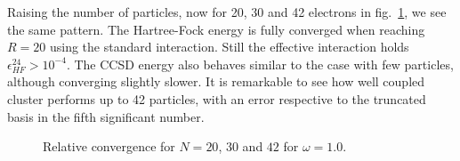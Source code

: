 Raising the number of particles, now for 20, 30 and 42 electrons in fig.~\ref{fig:results:convN20OM1}, we see the same pattern.
The Hartree-Fock energy is fully converged when reaching $R=20$ using the standard interaction.
Still the effective interaction holds $\epsilon^{24}_{HF} >  10^{-4}$.
The CCSD energy also behaves similar to the case with few particles, although converging slightly slower.
It is remarkable to see how well coupled cluster performs up to 42 particles, with an error respective to the truncated basis in the fifth significant number.
\begin{figure}
\begin{center}
\caption{Relative convergence for $N=20$, $30$ and $42$ for $\omega =1.0$.}
\label{fig:results:convN20OM1}
\end{center}
\end{figure}


